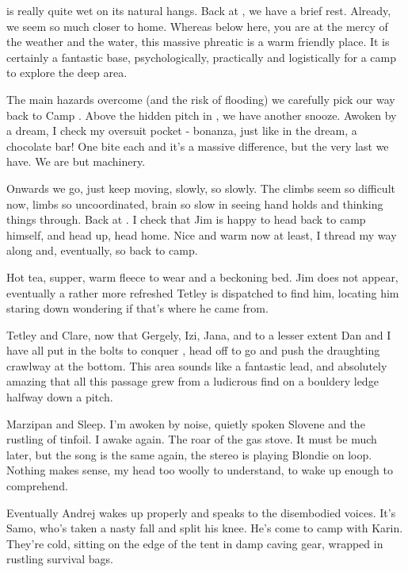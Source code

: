  is really quite wet on its natural hangs. Back at , we have a brief rest. Already, we seem so much closer to home.
Whereas below here, you are at the mercy of the weather and the water,
this massive phreatic is a warm friendly place. It is certainly a
fantastic base, psychologically, practically and logistically for a camp
to explore the deep area.

The main hazards overcome (and the risk of flooding) we carefully pick
our way back to Camp . Above the hidden pitch in ,
we have another snooze. Awoken by a dream, I check my oversuit pocket -
bonanza, just like in the dream, a chocolate bar! One bite each and it's
a massive difference, but the very last we have. We are but machinery.

Onwards we go, just keep moving, slowly, so slowly. The climbs seem so
difficult now, limbs so uncoordinated, brain so slow in seeing hand
holds and thinking things through. Back at . I check that Jim is happy to head back to camp himself, and
head up, head home. Nice and warm now at least, I thread my way along
 and, eventually, so back to camp.

Hot tea, supper, warm fleece to wear and a beckoning bed. Jim does not
appear, eventually a rather more refreshed Tetley is dispatched to find
him, locating him staring down  wondering if that's where
he came from.

Tetley and Clare, now that Gergely, Izi, Jana, and to a lesser extent
Dan and I have all put in the bolts to conquer ,
head off to go and push the draughting crawlway at the bottom. This area
sounds like a fantastic lead, and absolutely amazing that all this
passage grew from a ludicrous find on a bouldery ledge halfway down a
pitch.

Marzipan and Sleep. I'm awoken by noise, quietly spoken Slovene and the
rustling of tinfoil. I awake again. The roar of the gas stove. It must
be much later, but the song is the same again, the stereo is playing
Blondie on loop. Nothing makes sense, my head too woolly to understand,
to wake up enough to comprehend.

Eventually Andrej wakes up properly and speaks to the disembodied
voices. It's Samo, who's taken a nasty fall and split his knee. He's
come to camp with Karin. They're cold, sitting on the edge of the tent
in damp caving gear, wrapped in rustling survival bags.

